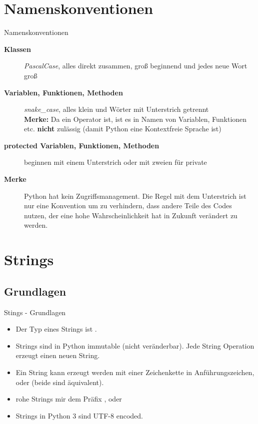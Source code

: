 \section{Namenskonventionen}
\begin{frame}[fragile]{Namenskonventionen}
	\begin{description}
	    \item[\textbf{Klassen}] \textit{PascalCase}, alles direkt zusammen, gro\ss{} beginnend und jedes neue Wort gro\ss{}
	    \item[\textbf{Variablen, Funktionen, Methoden}] \textit{snake\_case}, alles klein und Wörter mit Unterstrich getrennt \\
	    \textbf{Merke:} Da \codeline{-} ein Operator ist, ist es in Namen von Variablen, Funktionen etc. \textbf{nicht} zulässig (damit Python eine Kontextfreie Sprache ist)
	    \item[\textbf{protected Variablen, Funktionen, Methoden}] beginnen mit einem Unterstrich \codeline{\_} oder mit zweien \codeline{\_\_} für private
	    \item[\textbf{Merke}] Python hat kein Zugriffsmanagement. Die Regel mit dem Unterstrich ist nur eine Konvention um zu verhindern, dass andere Teile des Codes nutzen, der eine hohe Wahrscheinlichkeit hat in Zukunft verändert zu werden.
	\end{description}
\end{frame}


\section{Strings}
\subsection{Grundlagen}
\begin{frame}[fragile]{Stings - Grundlagen}
	\begin{itemize}
	    \item Der Typ eines Strings ist .
	    \item Strings sind in Python immutable (nicht veränderbar). Jede String Operation erzeugt einen neuen String.
	    \item Ein String kann erzeugt werden mit einer Zeichenkette in Anführungszeichen, \codeline{\'\'} oder \codeline{\"\"} (beide sind äquivalent).
	    \item rohe Strings mir dem Präfix ,  oder 
	    \item Strings in Python 3 sind UTF-8 encoded.
	\end{itemize}
\end{frame}


